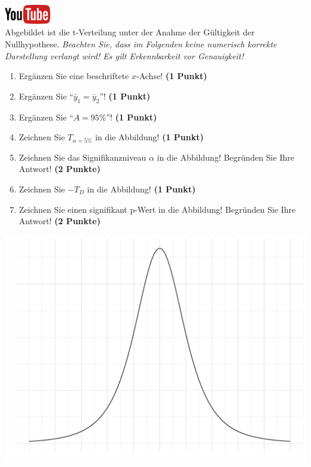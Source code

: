 \documentclass[a4paper, 9pt]{scrartcl}\usepackage[]{graphicx}\usepackage[]{xcolor}
\makeatletter
\def\maxwidth{ %
  \ifdim\Gin@nat@width>\linewidth
    \linewidth
  \else
    \Gin@nat@width
  \fi
}
\makeatother
\begin{document}
\hfill\href{https://youtu.be/32JjH1eyuTU}{\includegraphics[width =
  2cm]{img/youtube}}\\[1Ex]



Abgebildet ist die t-Verteilung unter der Anahme der G{\"u}ltigkeit der
Nullhypothese. \textit{Beachten Sie, dass im Folgenden keine
  numerisch korrekte Darstellung verlangt wird! Es gilt Erkennbarkeit vor
  Genauigkeit!}

\begin{enumerate}
\item Erg{\"a}nzen Sie eine beschriftete $x$-Achse! \textbf{(1 Punkt)}
\item Erg{\"a}nzen Sie "`$\bar{y}_1 = \bar{y}_2$"'! \textbf{(1 Punkt)} 
\item Erg{\"a}nzen Sie "`$A = 95\%$"'! \textbf{(1 Punkt)}
\item Zeichnen Sie $T_{\alpha=5\%}$ in die Abbildung! \textbf{(1 Punkt)} 
\item Zeichnen Sie das Signifikanzniveau $\alpha$ in die Abbildung! Begr{\"u}nden
  Sie Ihre Antwort! \textbf{(2 Punkte)} 
\item Zeichnen Sie $-T_{D}$ in die Abbildung! \textbf{(1
    Punkt)}
\item Zeichnen Sie einen signifikant p-Wert in die Abbildung! Begr{\"u}nden
  Sie Ihre Antwort! \textbf{(2 Punkte)}   
\end{enumerate}



{\centering \includegraphics[width=\maxwidth]{img/statistisches-testen-3-1} 

}
\end{document}
